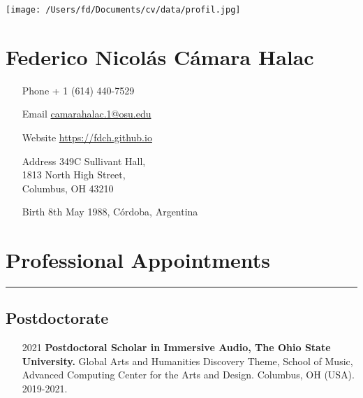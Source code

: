 \documentclass[12pt]{article}%
\begin{document}
%
\pagestyle{empty}%
\normalsize%
\pagestyle{empty}%
\raggedright%
\begin{minipage}{0.45\textwidth}%
\centering%
\texttt{[image: /Users/fd/Documents/cv/data/profil.jpg]}%
\end{minipage}%
\begin{minipage}{0.6\textwidth}%
\section{Federico Nicolás Cámara Halac}%
\label{sec:FedericoNicolsCmaraHalac}%
\begin{itemize}[align=parleft,leftmargin=2.25cm,labelwidth=2cm]
\item[Phone]
+ 1 (614) 440{-}7529
\item[Email]
\url{camarahalac.1@osu.edu}
\item[Website]
\url{https://fdch.github.io}
\item[Address]
349C Sullivant Hall,\\1813 North High Street,\\Columbus, OH 43210
\item[Birth]
8th May 1988, Córdoba, Argentina
\end{itemize}

%
\end{minipage}%
\hfill%
\section{Professional Appointments}%
\label{sec:ProfessionalAppointments}%
\hrule%
\subsection{Postdoctorate}%
\begin{itemize}[align=parleft,leftmargin=2.25cm,labelwidth=2cm]
\item[2021]
\textbf{Postdoctoral Scholar in Immersive Audio, The Ohio State University.}
Global Arts and Humanities Discovery Theme, School of Music, Advanced Computing Center for the Arts and Design. 
Columbus, OH (USA). 
2019{-}2021.
\end{itemize}%
\end{document}
